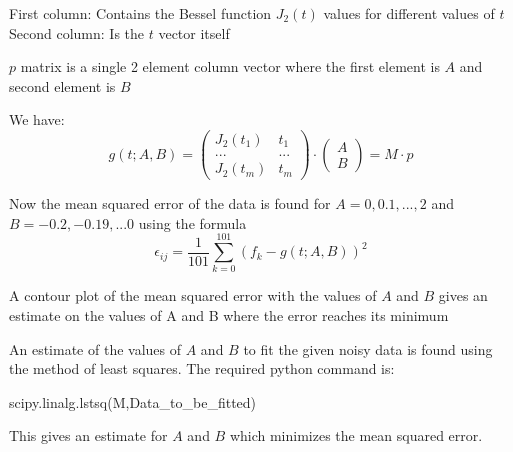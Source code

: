 \documentclass[12pt, a4paper]{report}
\begin{document}
First column: Contains the Bessel function $J_{2}(t)$ values for different values of $t$\\
Second column: Is the $t$ vector itself

$p$ matrix is a single 2 element column vector where the first element is $A$ and second element is $B$

We have:
\begin{equation}\label{eq:3}
g(t;A,B)=
\begin{pmatrix}
J_{2}(t_{1}) & t_{1}\\
... & ... \\
J_{2}(t_{m}) & t_{m}
\end{pmatrix}
\cdot
\begin{pmatrix}
A\\B
\end{pmatrix}
=M\cdot p
\end{equation}

Now the mean squared error of the data is found for $A = 0,0.1,...,2$ and $B = -0.2,-0.19,...0$ using the formula
\begin{equation}\label{eq:4}
\epsilon_{ij}=\frac{1}{101}\sum_{k=0}^{101}\left(f_{k}-g(t;A,B)\right)^{2}
\end{equation} 
 
A contour plot of the mean squared error with the values of $A$ and $B$ gives an estimate on the values of A and B where the error reaches its minimum

An estimate of the values of $A$ and $B$ to fit the given noisy data is found using the method of least squares. The required python command is:

\begin{psudo}
scipy.linalg.lstsq(M,Data_to_be_fitted)
\end{psudo}

This gives an estimate for $A$ and $B$ which minimizes the mean squared error.
\end{document}
